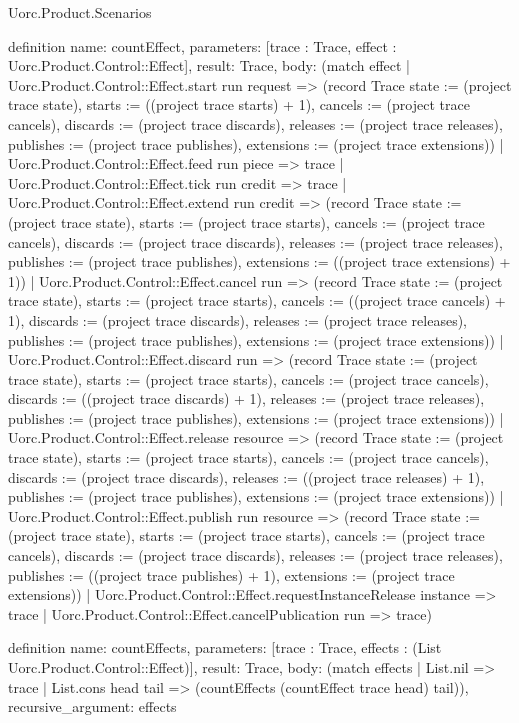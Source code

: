 \begin{lexlean}{Uorc.Product.Scenarios}
\begin{semanticmodule}
definition{
  name: countEffect,
  parameters: [trace : Trace, effect : Uorc.Product.Control::Effect],
  result: Trace,
  body: (match effect
    | Uorc.Product.Control::Effect.start run request => (record Trace {state := (project trace state), starts := ((project trace starts) + 1), cancels := (project trace cancels), discards := (project trace discards), releases := (project trace releases), publishes := (project trace publishes), extensions := (project trace extensions)})
    | Uorc.Product.Control::Effect.feed run piece => trace
    | Uorc.Product.Control::Effect.tick run credit => trace
    | Uorc.Product.Control::Effect.extend run credit => (record Trace {state := (project trace state), starts := (project trace starts), cancels := (project trace cancels), discards := (project trace discards), releases := (project trace releases), publishes := (project trace publishes), extensions := ((project trace extensions) + 1)})
    | Uorc.Product.Control::Effect.cancel run => (record Trace {state := (project trace state), starts := (project trace starts), cancels := ((project trace cancels) + 1), discards := (project trace discards), releases := (project trace releases), publishes := (project trace publishes), extensions := (project trace extensions)})
    | Uorc.Product.Control::Effect.discard run => (record Trace {state := (project trace state), starts := (project trace starts), cancels := (project trace cancels), discards := ((project trace discards) + 1), releases := (project trace releases), publishes := (project trace publishes), extensions := (project trace extensions)})
    | Uorc.Product.Control::Effect.release resource => (record Trace {state := (project trace state), starts := (project trace starts), cancels := (project trace cancels), discards := (project trace discards), releases := ((project trace releases) + 1), publishes := (project trace publishes), extensions := (project trace extensions)})
    | Uorc.Product.Control::Effect.publish run resource => (record Trace {state := (project trace state), starts := (project trace starts), cancels := (project trace cancels), discards := (project trace discards), releases := (project trace releases), publishes := ((project trace publishes) + 1), extensions := (project trace extensions)})
    | Uorc.Product.Control::Effect.requestInstanceRelease instance => trace
    | Uorc.Product.Control::Effect.cancelPublication run => trace)
}

definition{
  name: countEffects,
  parameters: [trace : Trace, effects : (List Uorc.Product.Control::Effect)],
  result: Trace,
  body: (match effects
    | List.nil => trace
    | List.cons head tail => (countEffects (countEffect trace head) tail)),
  recursive_argument: effects
}


\end{semanticmodule}
\end{lexlean}
